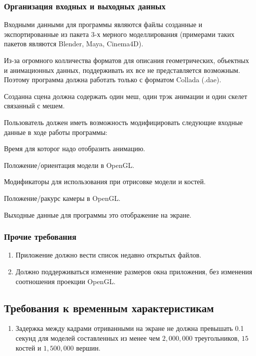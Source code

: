 \subsubsection{Организация входных и выходных данных}
\begin{my_enumerate}
\item Входными данными для программы являются файлы  созданные и экспортированные из пакета 3-х мерного моделлирования (примерами таких пакетов являются Blender, Maya, Cinema4D).
\item Из-за огромного колличества форматов для описания геометрических, объектных и анимационных данных, поддерживать их все не представляется возможным. Поэтому программа должна работать только с форматом Collada (.dae).
\item Созданна сцена должна содержать один меш, один трэк анимации и один скелет связанный с мешем.
\item Пользователь должен иметь возможность модифицировать следующие входные данные в ходе работы программы:
\begin{my_enumerate}
\item Время для которог надо отобразить анимацию.
\item Положение/ориентация модели в OpenGL.
\item Модификаторы для использования при отрисовке модели и костей.
\item Положение/ракурс камеры в OpenGL.
\end{my_enumerate}
\item Выходные данные для программы это отображение на экране.
\end{my_enumerate}

\subsubsection{Прочие требования}
\begin{enumerate}
\item Приложение должно вести список недавно открытых файлов.
\item Должно поддерживаться изменение размеров окна приложения, без изменения соотношения проекции OpenGL.
\end{enumerate}

\subsection{Требования к временным характеристикам}
\begin{enumerate}
\item Задержка между кадрами отриванными на экране не должна превышать 0.1 секунд для моделей составленных из менее чем $2,000,000$ треугольников, $15$ костей и  $1,500,000$ вершин.
\end{enumerate}


